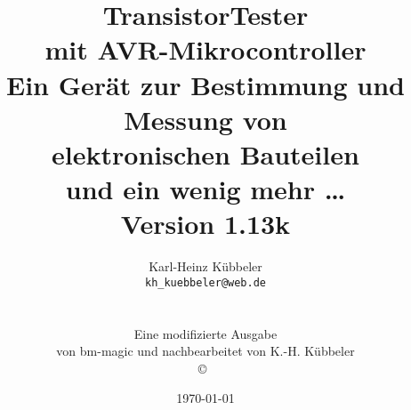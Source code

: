 \documentclass[pdftex,12pt,a4paper,oneside,english]{report}
\begin{document}
\begin{figure}[t]
\end{figure}
\newcommand\electricC {
\hspace{-10 pt}
\begin{circuitikz}
\draw (0,0) to[capacitor] (0:1);
\end{circuitikz}
\hspace{-6 pt}
}
\newcommand\electricR {
\hspace{-10 pt}
\begin{circuitikz}
\draw (0,0) to[european resistor] (0:1);
\end{circuitikz}
\hspace{-6 pt}
}
\newcommand\electricL {
\hspace{-10 pt}
\begin{circuitikz}
\draw (0,0) 
 to[american inductor] (-1,0);
\end{circuitikz}
\hspace{-6 pt}
}
\newcommand\electricDAK {
\begin{circuitikz}
\draw (0,0) to[full diode] (0:1);
\end{circuitikz}
}
\newcommand\electricDKA {
\begin{circuitikz}
\draw (0,0) to[full diode] (180:1);
\end{circuitikz}
}
\title{TransistorTester \\
mit AVR-Mikrocontroller \\
Ein Gerät zur Bestimmung und Messung von\\
elektronischen Bauteilen\\
und ein wenig mehr \dots\\
Version 1.13k \\
}
\author{Karl-Heinz Kübbeler\\
\texttt{kh\_kuebbeler@web.de}
\\
\\
\\
\scriptsize Eine modifizierte Ausgabe\\
\scriptsize von bm-magic und nachbearbeitet von K.-H. Kübbeler\\
\copyright~\\
\vspace*{-0.5cm}
}
\date{\today}
\maketitle
\tableofcontents
\end{document}
